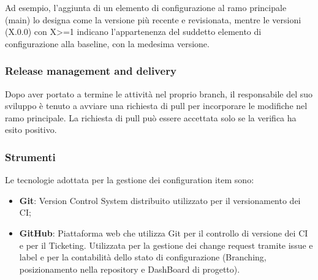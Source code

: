 Ad esempio, l'aggiunta di un elemento di configurazione al ramo principale (main) lo designa come la versione più recente e revisionata, mentre le versioni (X.0.0) con X>=1 indicano l'appartenenza del suddetto elemento di configurazione alla baseline, con la medesima versione.

\subsubsection{Release management and delivery}
Dopo aver portato a termine le attività nel proprio branch, il responsabile del suo sviluppo è tenuto a avviare una richiesta di pull per incorporare le modifiche nel ramo principale. La richiesta di pull può essere accettata solo se la verifica ha esito positivo.

\subsubsection{Strumenti}
Le tecnologie adottata per la gestione dei configuration item sono:
\begin{itemize}
    \item \textbf{Git}: Version Control System distribuito utilizzato per il versionamento dei CI;
    \item \textbf{GitHub}: Piattaforma web che utilizza Git per il controllo di versione dei CI e per il Ticketing.
          Utilizzata per la gestione dei change request tramite issue e label e per la contabilità dello stato di configurazione (Branching, posizionamento nella repository e DashBoard di progetto).
\end{itemize}
